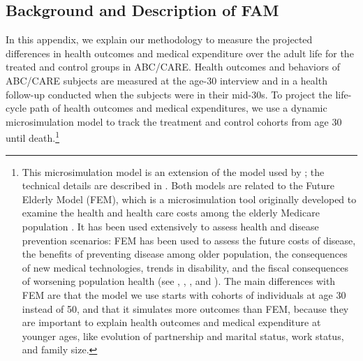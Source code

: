 \subsection{Background and Description of FAM}

\noindent In this appendix, we explain our methodology to measure the projected differences in health outcomes and medical expenditure over the adult life for the treated and control groups in ABC/CARE.
Health outcomes and behaviors of ABC/CARE subjects are measured at the age-30 interview and in a health follow-up conducted when the subjects were in their mid-30s.
To project the life-cycle path of health outcomes and medical expenditures, we use a dynamic microsimulation model to track the treatment and control cohorts from age 30 until death.\footnote{This microsimulation model is an extension of the model used by \citet{Prados_etal_2015_How-Much-Can-Education}; the technical details are described in \citet{Goldman_etal_2015_Future-Adult-Model}. Both models are related to the Future Elderly Model (FEM), which is a microsimulation tool originally developed to examine the health and health care costs among the elderly Medicare population \citep{Goldman_etal_2004_RAND-Report_Health-Status-Elderly}. It has been used extensively to assess health and disease prevention scenarios: FEM has been used to assess the future costs of disease, the benefits of preventing disease among older population, the consequences of new medical technologies, trends in disability, and the fiscal consequences of worsening population health (see \citet{Goldman_etal_2004_RAND-Report_Health-Status-Elderly}, \citet{Lakdawalla_etal_2004_Health-and-Cost}, \citet{Goldman_etal_2005_HA}, and \citet{Zissimopoulos_etal_2014_Delaying-Alzheimers}). The main differences with FEM are that the model we use starts with cohorts of individuals at age 30 instead of 50, and that it simulates more outcomes than FEM, because they are important to explain health outcomes and medical expenditure at younger ages, like evolution of partnership and marital status, work status, and family size.} 

